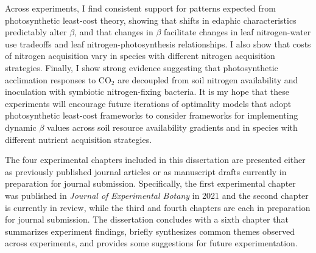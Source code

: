 Across experiments, I find consistent support for patterns expected from photosynthetic least-cost theory, showing that shifts in edaphic characteristics predictably alter $\beta$, and that changes in $\beta$ facilitate changes in leaf nitrogen-water use tradeoffs and leaf nitrogen-photosynthesis relationships. I also show that costs of nitrogen acquisition vary in species with different nitrogen acquisition strategies. Finally, I show strong evidence suggesting that photosynthetic acclimation responses to CO$_2$ are decoupled from soil nitrogen availability and inoculation with symbiotic nitrogen-fixing bacteria. It is my hope that these experiments will encourage future iterations of optimality models that adopt photosynthetic least-cost frameworks to consider frameworks for implementing dynamic $\beta$ values across soil resource availability gradients and in species with different nutrient acquisition strategies.

The four experimental chapters included in this dissertation are presented either as previously published journal articles or as manuscript drafts currently in preparation for journal submission. Specifically, the first experimental chapter was published in \textit{Journal of Experimental Botany} in 2021 and the second chapter is currently in review, while the third and fourth chapters are each in preparation for journal submission. The dissertation concludes with a sixth chapter that summarizes experiment findings, briefly synthesizes common themes observed across experiments, and provides some suggestions for future experimentation.